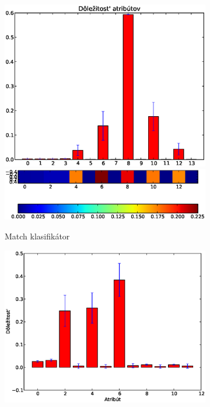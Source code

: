 \begin{figure}[htp]
        \centering
        \begin{subfigure}[t]{0.4\textwidth}
                \includegraphics[width=\textwidth]{images/clf_fi/randomforest_cmp_5_bars}
                \includegraphics[width=\textwidth]{images/clf_fi/randomforest_cmp_5_heatmap}
                \caption{Match klasifikátor}
                \label{fig:datatype2-m}
        \end{subfigure}%
        \qquad\qquad %
        \begin{subfigure}[t]{0.4\textwidth}
                \includegraphics[width=\textwidth]{images/clf_fi/randomforest_cmp_5_indel_bars}

\end{subfigure}
\end{figure}
